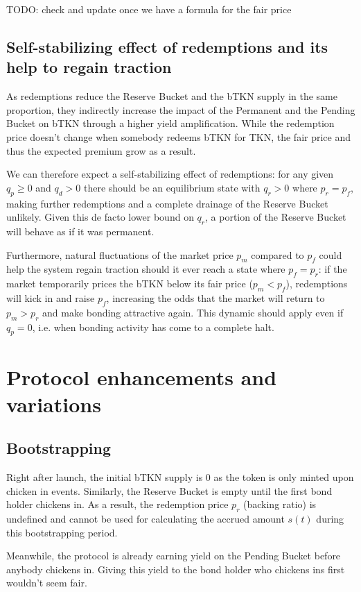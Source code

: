 \documentclass{article}
\begin{document}
TODO: check and update once we have a formula for the fair price

\subsection{Self-stabilizing effect of redemptions and its help to regain traction}
  \label{sec:self-stabilizing}
As redemptions reduce the Reserve Bucket and the bTKN supply in the same proportion, they indirectly increase the impact of the Permanent and the Pending Bucket on bTKN through a higher yield amplification. While the redemption price doesn't change when somebody redeems bTKN for TKN, the fair price and thus the expected premium grow as a result. 

We can therefore expect a self-stabilizing effect of redemptions: for any given $q_p \geq 0$ and $q_d > 0$ there should be an equilibrium state with $q_r > 0$ where $p_r = p_f$, making further redemptions and a complete drainage of the Reserve Bucket unlikely. Given this de facto lower bound on $q_r$, a portion of the Reserve Bucket will behave as if it was permanent.

Furthermore, natural fluctuations of the market price $p_m$ compared to $p_f$ could help the system regain traction should it ever reach a state where $p_f = p_r$: if the market temporarily prices the bTKN below its fair price ($p_m < p_f$), redemptions will kick in and raise $p_f$, increasing the odds that the market will return to $p_m > p_r$ and make bonding attractive again. This dynamic should apply even if $q_p = 0$, i.e. when bonding activity has come to a complete halt.

\section{Protocol enhancements and variations}
\subsection{Bootstrapping}
  \label{sec:bootstrapping}
Right after launch, the initial bTKN supply is 0 as the token is only minted upon chicken in events. Similarly, the Reserve Bucket is empty until the first bond holder chickens in. As a result, the redemption price $p_r$ (backing ratio) is undefined and cannot be used for calculating the accrued amount $s(t)$ during this bootstrapping period.

Meanwhile, the protocol is already earning yield on the Pending Bucket before anybody chickens in. Giving this yield to the bond holder who chickens ins first wouldn't seem fair. 
\end{document}
